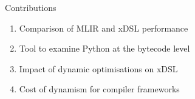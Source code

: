 \documentclass[10pt,aspectratio=169]{beamer}
\begin{document}
\begin{frame}{Contributions}
    \Large
    \begin{enumerate}
        \item Comparison of MLIR and xDSL performance
        \vspace{0.5em}
        \item Tool to examine Python at the bytecode level
        \vspace{0.5em}
        \item Impact of dynamic optimisations on xDSL
        \vspace{0.5em}
        \item Cost of dynamism for compiler frameworks
    \end{enumerate}
\end{frame}
\end{document}
